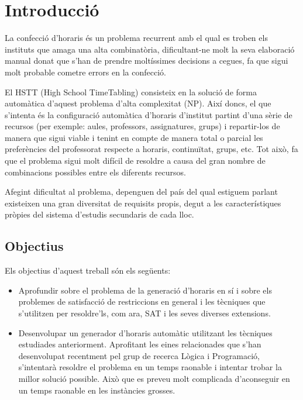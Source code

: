 \documentclass[11pt,a4paper,oneside]{article}
\begin{document}
  
  \tableofcontents \newpage

  \section{Introducció}
  
  La confecció d'horaris és un problema recurrent amb el qual es troben els instituts que amaga una alta combinatòria, 
  dificultant-ne molt la seva elaboració manual donat que s'han de prendre moltíssimes decisions a cegues,
  fa que sigui molt probable cometre errors en la confecció.

  El HSTT (High School TimeTabling) consisteix en la solució de forma automàtica d'aquest problema d'alta complexitat (NP). 
  Així doncs, el que s'intenta és la configuració automàtica d'horaris d'institut partint d'una sèrie de recursos 
  (per exemple: aules, professors, assignatures, grups) i repartir-los de manera que sigui viable i tenint en compte 
  de manera total o parcial les preferències del professorat respecte a horaris, continuïtat, grups, etc. 
  Tot això, fa que el problema sigui molt difícil de resoldre a causa del gran nombre de combinacions possibles entre els diferents recursos.
  
  Afegint dificultat al problema, depenguen del país del qual estiguem parlant existeixen una gran diversitat de requisits propis, degut a les característiques pròpies del sistema d'estudis secundaris de cada lloc.



  \subsection{Objectius}
  Els objectius d'aquest treball són els següents:
  \begin{itemize}
    \item Aprofundir sobre el problema de la generació d'horaris en sí i sobre els problemes de satisfacció de restriccions en general i les tècniques que s'utilitzen per resoldre'ls, com ara, SAT i les seves diverses extensions.
    \item Desenvolupar un generador d'horaris automàtic utilitzant les tècniques estudiades anteriorment. 
    Aprofitant les eines relacionades que s'han desenvolupat recentment pel grup de recerca Lògica i Programació, 
    s'intentarà resoldre el problema en un temps raonable i intentar trobar la millor solució possible. 
    Això que es preveu molt complicada d'aconseguir en un temps raonable en les instàncies grosses.
    
  \end{itemize}
  
\end{document}
